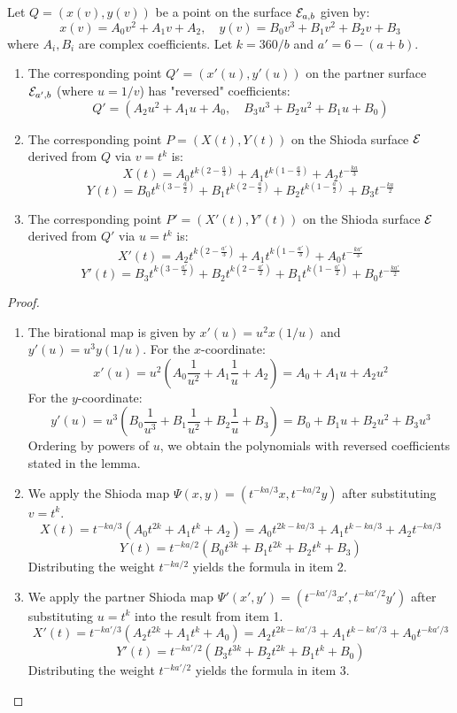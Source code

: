 \documentclass[11pt]{amsart}
\begin{document}
\begin{lema}
	\label{lem:cubic_transform}
	Let $Q = (x(v), y(v))$ be a point on the surface ${\mathcal E}_{a,b}$ given by:
	\[ x(v) = A_0 v^2 + A_1 v + A_2, \quad y(v) = B_0 v^3 + B_1 v^2 + B_2 v + B_3 \]
	where $A_i, B_i$ are complex coefficients. Let $k = 360/b$ and $a' = 6-(a+b)$.
	
	\begin{enumerate}
		\item [(i)] The corresponding point $Q'=(x'(u), y'(u))$ on the partner surface ${\mathcal E}_{a', b}$ (where $u=1/v$) has "reversed" coefficients:
		\[ Q' = (A_2 u^2 + A_1 u + A_0, \quad B_3 u^3 + B_2 u^2 + B_1 u + B_0) \]
		
		\item [(ii)] The corresponding point $P=(X(t), Y(t))$ on the Shioda surface ${\mathcal E}$ derived from $Q$ via $v=t^k$ is:
		\[ X(t) = A_0 t^{k(2 - \frac{a}{3})} + A_1 t^{k(1 - \frac{a}{3})} + A_2 t^{-\frac{ka}{3}} \]
		\[ Y(t) = B_0 t^{k(3 - \frac{a}{2})} + B_1 t^{k(2 - \frac{a}{2})} + B_2 t^{k(1 - \frac{a}{2})} + B_3 t^{-\frac{ka}{2}} \]
		
		\item [(iii)] The corresponding point $P'=(X'(t), Y'(t))$ on the Shioda surface ${\mathcal E}$ derived from $Q'$ via $u=t^k$ is:
		\[ X'(t) = A_2 t^{k(2 - \frac{a'}{3})} + A_1 t^{k(1 - \frac{a'}{3})} + A_0 t^{-\frac{ka'}{3}} \]
		\[ Y'(t) = B_3 t^{k(3 - \frac{a'}{2})} + B_2 t^{k(2 - \frac{a'}{2})} + B_1 t^{k(1 - \frac{a'}{2})} + B_0 t^{-\frac{ka'}{2}} \]
	\end{enumerate}
\end{lema}

\begin{proof}
	\begin{enumerate}
	\item [(i)] The birational map is given by $x'(u) = u^2 x(1/u)$ and $y'(u) = u^3 y(1/u)$. 
	For the $x$-coordinate:
	\[ x'(u) = u^2 \left( A_0 \frac{1}{u^2} + A_1 \frac{1}{u} + A_2 \right) = A_0 + A_1 u + A_2 u^2 \]
	For the $y$-coordinate:
	\[ y'(u) = u^3 \left( B_0 \frac{1}{u^3} + B_1 \frac{1}{u^2} + B_2 \frac{1}{u} + B_3 \right) = B_0 + B_1 u + B_2 u^2 + B_3 u^3 \]
	Ordering by powers of $u$, we obtain the polynomials with reversed coefficients stated in the lemma.
	
\item [(ii)] We apply the Shioda map $\Psi(x,y) = (t^{-ka/3}x, t^{-ka/2}y)$ after substituting $v=t^k$.
	\[ X(t) = t^{-ka/3}(A_0 t^{2k} + A_1 t^k + A_2) = A_0 t^{2k-ka/3} + A_1 t^{k-ka/3} + A_2 t^{-ka/3} \]
	\[ Y(t) = t^{-ka/2}(B_0 t^{3k} + B_1 t^{2k} + B_2 t^k + B_3) \]
	Distributing the weight $t^{-ka/2}$ yields the formula in item 2.
	
\item [(ii)] We apply the partner Shioda map $\Psi'(x',y') = (t^{-ka'/3}x', t^{-ka'/2}y')$ after substituting $u=t^k$ into the result from item 1.
	\[ X'(t) = t^{-ka'/3}(A_2 t^{2k} + A_1 t^k + A_0) = A_2 t^{2k-ka'/3} + A_1 t^{k-ka'/3} + A_0 t^{-ka'/3} \]
	\[ Y'(t) = t^{-ka'/2}(B_3 t^{3k} + B_2 t^{2k} + B_1 t^k + B_0) \]
	Distributing the weight $t^{-ka'/2}$ yields the formula in item 3.
	\end{enumerate}
\end{proof}
\end{document}
